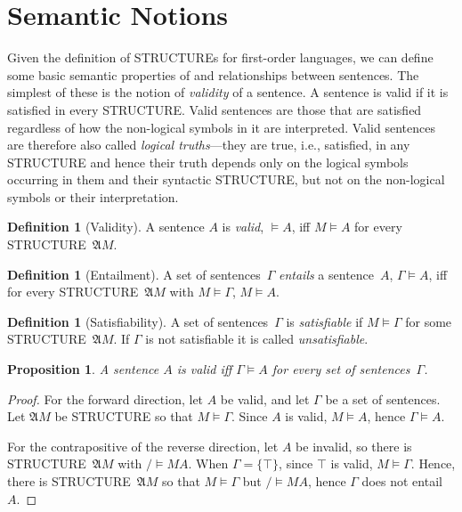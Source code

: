 \documentclass[10pt,a4paper]{article}
\newcommand*{\olup}[1]{\MakeUppercase{#1}}
\theoremstyle{plain}
\newtheorem{prop}[thm]{Proposition}
\theoremstyle{definition}
\newtheorem{defn}[thm]{Definition}
\theoremstyle{remark}
\newenvironment{explain}{}{}
\newcommand*{\olfileid}[3]{}
\newcommand*{\olsection}[1]{\section*{#1}}
\providecommand{\ltrue}{\top}
\providecommand{\Entails}{\mathrel{\models}}
\providecommand{\Struct}{\ensuremath{\mathfrak{A}}}
\providecommand{\Sat}[2]{\ensuremath{#1 \models #2}}
\begin{document}
\olfileid{fol}{syn}{sem}
\olsection{Semantic Notions}

\begin{explain}
Given the definition of \olup{structure}s for first-order languages, we can
define some basic semantic properties of and relationships between
sentences.  The simplest of these is the notion of \emph{validity} of
a sentence.  A sentence is valid if it is satisfied in every
\olup{structure}.  Valid sentences are those that are satisfied regardless of
how the non-logical symbols in it are interpreted.  Valid sentences
are therefore also called \emph{logical truths}---they are true, i.e.,
satisfied, in any \olup{structure} and hence their truth depends only on the
logical symbols occurring in them and their syntactic \olup{structure}, but not
on the non-logical symbols or their interpretation.
\end{explain}

\begin{defn}[Validity]
A sentence $A$ is \emph{valid}, $\Entails A$, iff $\Sat{M}{A}$ for every
\olup{structure}~$\Struct M$.
\end{defn}

\begin{defn}[Entailment]
A set of sentences~$\Gamma$ \emph{entails} a sentence~$A$, $\Gamma
\Entails A$, iff for every \olup{structure}~$\Struct M$ with
$\Sat{M}{\Gamma}$, $\Sat{M}{A}$.
\end{defn}


\begin{defn}[Satisfiability]
A set of sentences~$\Gamma$ is \emph{satisfiable} if $\Sat{M}{\Gamma}$
for some \olup{structure}~$\Struct M$.  If $\Gamma$ is not satisfiable it is
called \emph{unsatisfiable}.
\end{defn}

\begin{prop}
A sentence $A$ is valid iff $\Gamma \Entails A$ for every set of
sentences~$\Gamma$.
\end{prop}

\begin{proof}
For the forward direction, let $A$ be valid, and let $\Gamma$ be a
set of sentences. Let $\Struct M$ be \olup{structure} so that
$\Sat{M}{\Gamma}$. Since $A$ is valid, $\Sat{M}{A}$, hence $\Gamma
\Entails A$.

For the contrapositive of the reverse direction, let $A$ be invalid,
so there is \olup{structure}~$\Struct M$ with $\Sat/{M}{A}$. When $\Gamma
= \{ \ltrue \}$, since $\ltrue$ is valid, $\Sat{M}{\Gamma}$. Hence,
there is \olup{structure}~$\Struct M$ so that $\Sat{M}{\Gamma}$ but
$\Sat/{M}{A}$, hence $\Gamma$ does not entail $A$.
\end{proof}
\end{document}
